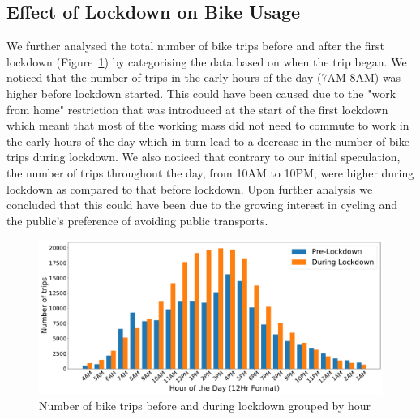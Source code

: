 \documentclass[11pt,a4paper]{article}
\begin{document}
\subsection{Effect of Lockdown on Bike Usage}
\vspace{-5mm}
We further analysed the total number of bike trips before and after the first lockdown  (Figure~\ref{total_trips_pre_post_lockdown_grouped_by_hour}) by categorising the data based on when the trip began. We noticed that the number of trips in the early hours of the day (7AM-8AM) was higher before lockdown started. This could have been caused due to the "work from home" restriction that was introduced at the start of the first lockdown which meant that most of the working mass did not need to commute to work in the early hours of the day which in turn lead to a decrease in the number of bike trips during lockdown. We also noticed that contrary to our initial speculation, the number of trips throughout the day, from 10AM to  10PM, were higher during lockdown as compared to that before lockdown. Upon further analysis we concluded that this could have been due to the growing interest in cycling and the public's preference of avoiding public transports.

\begin{figure}[h]
    \centering
    \includegraphics[width=\linewidth]{datasets/total_trips_by_hour_pre_post_lockdown.pdf}
    \caption{Number of bike trips before and during lockdown grouped by hour}
    \label{total_trips_pre_post_lockdown_grouped_by_hour}
\end{figure}
\end{document}
